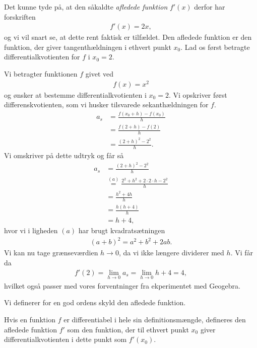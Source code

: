 Det kunne tyde på, at den såkaldte \textit{afledede funktion} $f'(x)$ derfor har forskriften 
\begin{align*}
	f'(x) = 2x,
\end{align*}
og vi vil snart se, at dette rent faktisk er tilfældet. Den afledede funktion er den funktion, der giver tangenthældningen i ethvert punkt $x_0$. Lad os først betragte differentialkvotienten for $f$ i $x_0 = 2$.
\begin{exa}
	\label{exa:diffkvo}
	Vi betragter funktionen $f$ givet ved
	\begin{align*}
		f(x) = x^2
	\end{align*}
	og ønsker at bestemme differentialkvotienten i $x_0 = 2$. Vi opskriver først differenskvotienten, som vi
	husker tilsvarede sekanthældningen for $f$. 
	\begin{align*}
		a_s &= \frac{f(x_0 + h)-f(x_0)}{h}\\
		&= \frac{f(2 + h)-f(2)}{h}\\
		&= \frac{(2+h)^2 - 2^2}{h}.
	\end{align*}
	Vi omskriver på dette udtryk og får så
	\begin{align*}
		a_s &= \frac{(2+h)^2 - 2^2}{h} \\
		&\stackrel{(a)}{=} \frac{2^2 + h^2 + 2\cdot 2\cdot h - 2^2}{h} \\
		&= \frac{h^2+4h}{h} \\
		&= \frac{h(h+4)}{h} \\
		&= h + 4,
	\end{align*}
	hvor vi i ligheden $(a)$ har brugt kvadratsætningen 
	\begin{align*}
		(a+b)^2 = a^2 + b^2 +2ab.
	\end{align*}
	Vi kan nu tage grænseværdien $h \to 0$, da vi ikke længere dividerer med $h$. Vi får da
	\begin{align*}
		f'(2) = \lim_{h \to 0}a_s = \lim_{h \to 0} h + 4 = 4,
	\end{align*}
	hvilket også passer med vores forventninger fra ekperimentet med Geogebra. 
\end{exa}

Vi definerer for en god ordens skyld den afledede funktion.
\begin{defn}
	Hvis en funktion $f$ er differentiabel i hele sin definitionsmængde, defineres den afledede funktion $f'
	$ som den funktion, der til ethvert punkt $x_0$ giver differentialkvotienten i dette punkt som $f'(x_0)$.
\end{defn}

